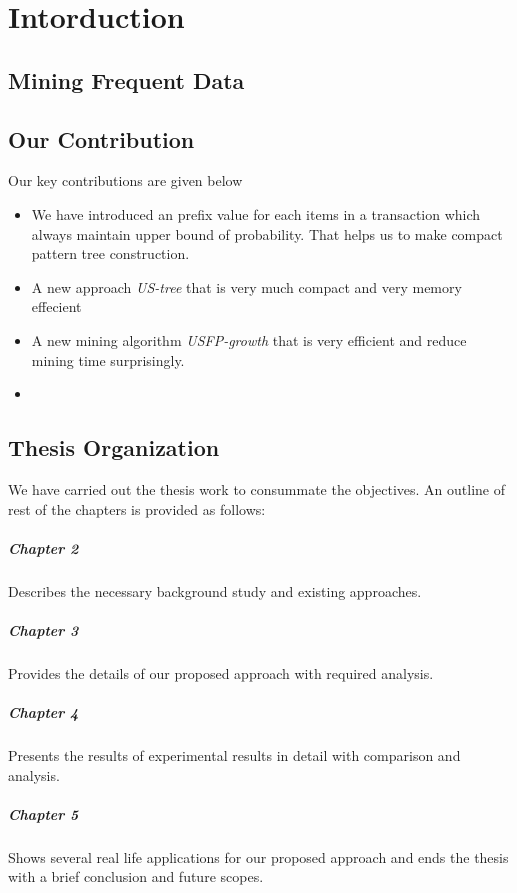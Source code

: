 %
\chapter{Intorduction}
\section{Mining Frequent Data}
\section{Our Contribution}
Our key contributions are given below
\begin{itemize}
\item We have introduced an prefix value for each items in a transaction which always maintain upper bound of probability. That helps us to make compact pattern tree construction.
\item A new approach \emph{US-tree} that is very much compact and very memory effecient
\item A new mining algorithm \emph{USFP-growth} that is very efficient and reduce mining time surprisingly.
\item 
\end{itemize}
\section{Thesis Organization}
We have carried out the thesis work to consummate the objectives. An outline of rest of the chapters is provided as follows:
\paragraph{Chapter 2}
Describes the necessary background study and existing approaches.
\paragraph{Chapter 3}
Provides the details of our proposed approach with required analysis.
\paragraph{Chapter 4}
Presents the results of experimental results in detail with comparison and analysis.
\paragraph{Chapter 5}
Shows several real life applications for our proposed approach and ends the thesis with a brief conclusion and future scopes.
%